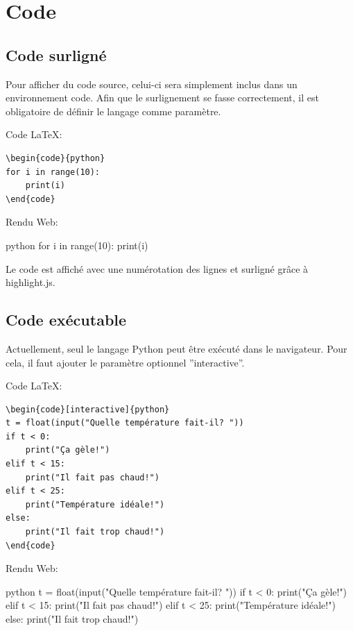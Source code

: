\documentclass[a4paper,11pt]{article}
\begin{document}
\section{Code}
\subsection{Code surligné}
Pour afficher du code source, celui-ci sera simplement inclus dans un environnement code. Afin que le surlignement se fasse correctement, il est obligatoire de définir le langage comme paramètre.\par

Code LaTeX:
\begin{lstlisting}
\begin{code}{python}
for i in range(10):
    print(i)
\end{code}
\end{lstlisting}

Rendu Web:\par
\begin{code}{python}
for i in range(10):
    print(i)
\end{code}

Le code est affiché avec une numérotation des lignes et surligné grâce à highlight.js.

\subsection{Code exécutable}
Actuellement, seul le langage Python peut être exécuté dans le navigateur. Pour cela, il faut ajouter le paramètre optionnel ”interactive”.\par

Code LaTeX:
\begin{lstlisting}
\begin{code}[interactive]{python}
t = float(input("Quelle température fait-il? "))
if t < 0:
    print("Ça gèle!")
elif t < 15:
    print("Il fait pas chaud!")
elif t < 25:
    print("Température idéale!")
else:
    print("Il fait trop chaud!")
\end{code}
\end{lstlisting}

Rendu Web:\par
\begin{code}[interactive]{python}
t = float(input("Quelle température fait-il? "))
if t < 0:
    print("Ça gèle!")
elif t < 15:
    print("Il fait pas chaud!")
elif t < 25:
    print("Température idéale!")
else:
    print("Il fait trop chaud!")
\end{code}
\end{document}

